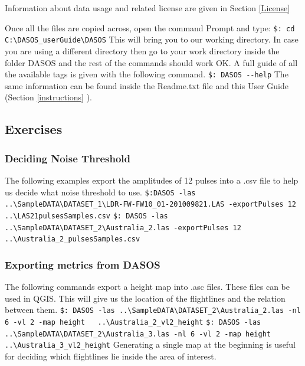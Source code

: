 \documentclass{article}
\begin{document}
	   	
	    \par Information about data usage and related license are given in Section \ref{License}
	   	
		\par Once all the files are copied across, open the command Prompt and type:\newline
		\verb|$: cd C:\DASOS_userGuide\DASOS| \newline 
		This will bring you to our working directory. In case you are using a different directory then go to your work directory inside the folder DASOS and the rest of the commands should work OK. 
        \newline\newline
		A full guide of all the available tags is given with the following command. \newline
		\verb|$: DASOS --help| \newline
		 The same information can be found inside the Readme.txt file and this User Guide (Section \ref{instructions} ).
		
	   	\subsection{Exercises}
		\subsubsection{Deciding Noise Threshold}
		The following examples export the amplitudes of 12 pulses into a .csv file to help us decide what noise threshold to use. \newline\newline
		\verb|$:DASOS -las ..\SampleDATA\DATASET_1\LDR-FW-FW10_01-201009821.LAS -exportPulses 12|\newline \verb|   ..\LAS21pulsesSamples.csv|
		\newline\newline
		\verb|$: DASOS -las ..\SampleDATA\DATASET_2\Australia_2.las -exportPulses 12|\newline \verb|   ..\Australia_2_pulsesSamples.csv|
				
		\subsubsection{Exporting metrics from DASOS}
		The following commands export a height map into .asc files. These files can be used in QGIS. This will give us the location of the flightlines and the relation between them.
		\newline\newline
		\verb|$: DASOS -las ..\SampleDATA\DATASET_2\Australia_2.las -nl 6 -vl 2 -map height|\newline \verb|   ..\Australia_2_vl2_height|				
		\newline\newline
		\verb|$: DASOS -las ..\SampleDATA\DATASET_2\Australia_3.las -nl 6 -vl 2 -map height|\newline \verb|   ..\Australia_3_vl2_height|
		\newline\newline
		Generating a single map at the beginning is useful for deciding which flightlines lie inside the area of interest. 
		
\end{document}
